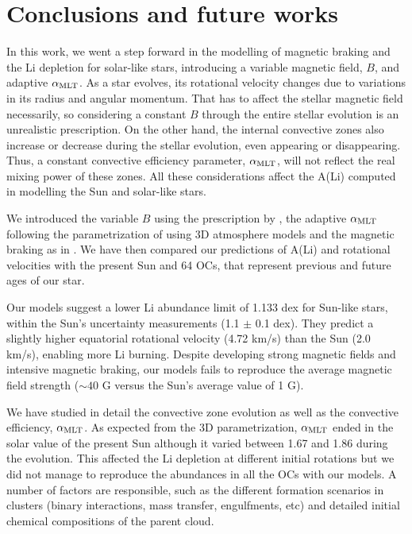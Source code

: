 \documentclass[fleqn,usenatbib]{mnras}
\begin{document}
\section{Conclusions and future works} \label{sec_conclusions}

In this work, we went a step forward in the modelling of magnetic braking and the Li depletion for solar-like stars, introducing a variable magnetic field, $B$, and adaptive $\alpha_{\mathrm{MLT}}$. As  a star evolves, its rotational velocity changes due to variations in its radius and angular momentum. That has to affect the stellar magnetic field necessarily, so considering a constant $B$ through the entire stellar evolution is an unrealistic prescription. On the other hand, the internal convective zones also increase or decrease during the stellar evolution, even appearing or disappearing. Thus, a constant convective efficiency parameter, $\alpha_{\mathrm{MLT}}$, will not reflect the real mixing power of these zones. All these considerations affect the A(Li) computed in modelling the Sun and solar-like stars.\par

We introduced the variable $B$ using the prescription by \cite{Gallet2013}, the adaptive $\alpha_{\mathrm{MLT}}$ following the parametrization of \citet{Sonoi2018} using 3D atmosphere models and the magnetic braking as in \citet{Caballero2020}. We have then compared our predictions of A(Li) and rotational velocities with the present Sun and 64 OCs, that represent previous and future ages of our star.\par

Our models suggest a lower Li abundance limit of 1.133 dex for Sun-like stars, within the Sun's uncertainty measurements (1.1 $\pm$ 0.1 dex). They predict a slightly higher equatorial rotational velocity (4.72 km/s) than the Sun (2.0 km/s), enabling more Li burning. Despite developing strong magnetic fields and intensive magnetic braking, our models fails to reproduce the average magnetic field strength ($\sim 40$ G versus the Sun's average value of 1 G).\par

We have studied in detail the convective zone evolution as well as the convective efficiency, $\alpha_{\mathrm{MLT}}$. As expected from the 3D parametrization, $\alpha_{\mathrm{MLT}}$ ended in the solar value of the present Sun although it varied between 1.67 and 1.86 during the evolution. This affected the Li depletion at different initial rotations but we did not manage to reproduce the abundances in all the OCs with our models. A number of factors are responsible, such as the different formation scenarios in clusters (binary interactions, mass transfer, engulfments, etc) and detailed initial chemical compositions of the parent cloud.
\end{document}

